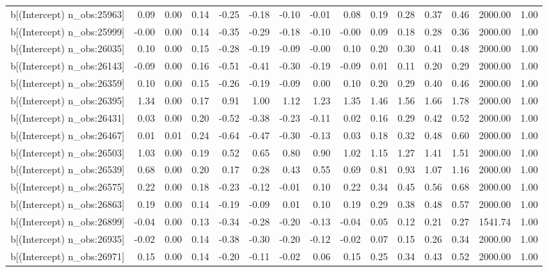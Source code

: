 \begin{table}[ht]
\begin{tabular}{rrrrrrrrrrrrrrr}
  b[(Intercept) n\_obs:25963] & 0.09 & 0.00 & 0.14 & -0.25 & -0.18 & -0.10 & -0.01 & 0.08 & 0.19 & 0.28 & 0.37 & 0.46 & 2000.00 & 1.00 \\ 
  b[(Intercept) n\_obs:25999] & -0.00 & 0.00 & 0.14 & -0.35 & -0.29 & -0.18 & -0.10 & -0.00 & 0.09 & 0.18 & 0.28 & 0.36 & 2000.00 & 1.00 \\ 
  b[(Intercept) n\_obs:26035] & 0.10 & 0.00 & 0.15 & -0.28 & -0.19 & -0.09 & -0.00 & 0.10 & 0.20 & 0.30 & 0.41 & 0.48 & 2000.00 & 1.00 \\ 
  b[(Intercept) n\_obs:26143] & -0.09 & 0.00 & 0.16 & -0.51 & -0.41 & -0.30 & -0.19 & -0.09 & 0.01 & 0.11 & 0.20 & 0.29 & 2000.00 & 1.00 \\ 
  b[(Intercept) n\_obs:26359] & 0.10 & 0.00 & 0.15 & -0.26 & -0.19 & -0.09 & 0.00 & 0.10 & 0.20 & 0.29 & 0.40 & 0.46 & 2000.00 & 1.00 \\ 
  b[(Intercept) n\_obs:26395] & 1.34 & 0.00 & 0.17 & 0.91 & 1.00 & 1.12 & 1.23 & 1.35 & 1.46 & 1.56 & 1.66 & 1.78 & 2000.00 & 1.00 \\ 
  b[(Intercept) n\_obs:26431] & 0.03 & 0.00 & 0.20 & -0.52 & -0.38 & -0.23 & -0.11 & 0.02 & 0.16 & 0.29 & 0.42 & 0.52 & 2000.00 & 1.00 \\ 
  b[(Intercept) n\_obs:26467] & 0.01 & 0.01 & 0.24 & -0.64 & -0.47 & -0.30 & -0.13 & 0.03 & 0.18 & 0.32 & 0.48 & 0.60 & 2000.00 & 1.00 \\ 
  b[(Intercept) n\_obs:26503] & 1.03 & 0.00 & 0.19 & 0.52 & 0.65 & 0.80 & 0.90 & 1.02 & 1.15 & 1.27 & 1.41 & 1.51 & 2000.00 & 1.00 \\ 
  b[(Intercept) n\_obs:26539] & 0.68 & 0.00 & 0.20 & 0.17 & 0.28 & 0.43 & 0.55 & 0.69 & 0.81 & 0.93 & 1.07 & 1.16 & 2000.00 & 1.00 \\ 
  b[(Intercept) n\_obs:26575] & 0.22 & 0.00 & 0.18 & -0.23 & -0.12 & -0.01 & 0.10 & 0.22 & 0.34 & 0.45 & 0.56 & 0.68 & 2000.00 & 1.00 \\ 
  b[(Intercept) n\_obs:26863] & 0.19 & 0.00 & 0.14 & -0.19 & -0.09 & 0.01 & 0.10 & 0.19 & 0.29 & 0.38 & 0.48 & 0.57 & 2000.00 & 1.00 \\ 
  b[(Intercept) n\_obs:26899] & -0.04 & 0.00 & 0.13 & -0.34 & -0.28 & -0.20 & -0.13 & -0.04 & 0.05 & 0.12 & 0.21 & 0.27 & 1541.74 & 1.00 \\ 
  b[(Intercept) n\_obs:26935] & -0.02 & 0.00 & 0.14 & -0.38 & -0.30 & -0.20 & -0.12 & -0.02 & 0.07 & 0.15 & 0.26 & 0.34 & 2000.00 & 1.00 \\ 
  b[(Intercept) n\_obs:26971] & 0.15 & 0.00 & 0.14 & -0.20 & -0.11 & -0.02 & 0.06 & 0.15 & 0.25 & 0.34 & 0.43 & 0.52 & 2000.00 & 1.00 \\ 

\end{tabular}
\end{table}
